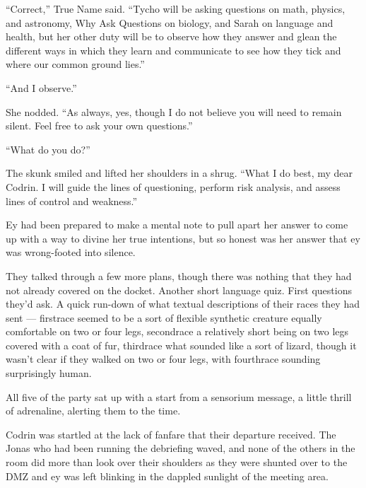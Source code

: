 ``Correct,'' True Name said. ``Tycho will be asking questions on math, physics, and astronomy, Why Ask Questions on biology, and Sarah on language and health, but her other duty will be to observe how they answer and glean the different ways in which they learn and communicate to see how they tick and where our common ground lies.''

``And I observe.''

She nodded. ``As always, yes, though I do not believe you will need to remain silent. Feel free to ask your own questions.''

``What do you do?''

The skunk smiled and lifted her shoulders in a shrug. ``What I do best, my dear Codrin. I will guide the lines of questioning, perform risk analysis, and assess lines of control and weakness.''

Ey had been prepared to make a mental note to pull apart her answer to come up with a way to divine her true intentions, but so honest was her answer that ey was wrong-footed into silence.

They talked through a few more plans, though there was nothing that they had not already covered on the docket. Another short language quiz. First questions they'd ask. A quick run-down of what textual descriptions of their races they had sent — firstrace seemed to be a sort of flexible synthetic creature equally comfortable on two or four legs, secondrace a relatively short being on two legs covered with a coat of fur, thirdrace what sounded like a sort of lizard, though it wasn't clear if they walked on two or four legs, with fourthrace sounding surprisingly human.

All five of the party sat up with a start from a sensorium message, a little thrill of adrenaline, alerting them to the time.

Codrin was startled at the lack of fanfare that their departure received. The Jonas who had been running the debriefing waved, and none of the others in the room did more than look over their shoulders as they were shunted over to the DMZ and ey was left blinking in the dappled sunlight of the meeting area.
